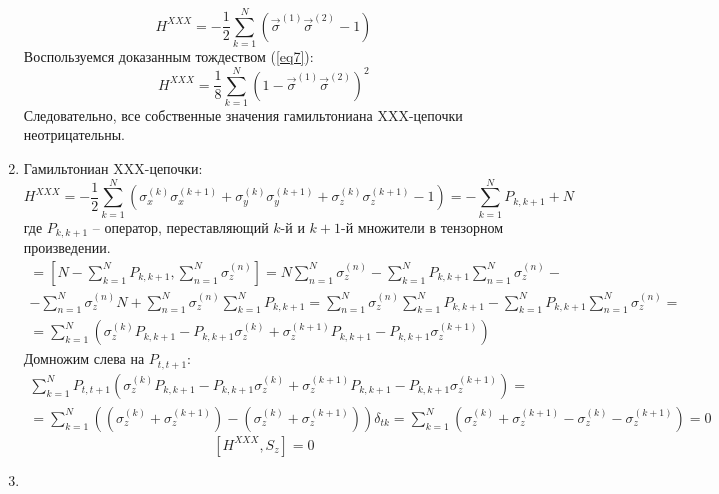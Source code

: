 \documentclass[12pt]{article}
\begin{document}
\begin{enumerate}
\begin{equation}
    \end{equation}
    \begin{equation}
        H^{XXX}=-\frac{1}{2}\sum\limits_{k=1}^N(\vec{\sigma}^{(1)}\vec{\sigma}^{(2)}-1)
    \end{equation}
    Воспользуемся доказанным тождеством (\ref{eq7}):
    \begin{equation}
        H^{XXX}=\frac{1}{8}\sum\limits_{k=1}^N(1-\vec{\sigma}^{(1)}\vec{\sigma}^{(2)})^2
    \end{equation}
    Следовательно, все собственные значения гамильтониана XXX-цепочки неотрицательны.
    \item Гамильтониан XXX-цепочки:
    \begin{equation}
        H^{XXX}=-\frac{1}{2}\sum\limits_{k=1}^N(\sigma_x^{(k)}\sigma_x^{(k+1)}+\sigma_y^{(k)}\sigma_y^{(k+1)}+\sigma_z^{(k)}\sigma_z^{(k+1)}-1)=-\sum\limits_{k=1}^NP_{k,k+1}+N
    \end{equation}
    где $P_{k,k+1}$ -- оператор, переставляющий $k$-й и $k+1$-й множители в тензорном произведении.
    \begin{multline}
        [H^{XXX},S_z]=[N-\sum\limits_{k=1}^NP_{k,k+1},\sum\limits_{n=1}^N\sigma_z^{(n)}]=N\sum\limits_{n=1}^N\sigma_z^{(n)}-\sum\limits_{k=1}^NP_{k,k+1}\sum\limits_{n=1}^N\sigma_z^{(n)}-\\
        -\sum\limits_{n=1}^N\sigma_z^{(n)}N+\sum\limits_{n=1}^N\sigma_z^{(n)}\sum\limits_{k=1}^NP_{k,k+1}=\sum\limits_{n=1}^N\sigma_z^{(n)}\sum\limits_{k=1}^NP_{k,k+1}-\sum\limits_{k=1}^NP_{k,k+1}\sum\limits_{n=1}^N\sigma_z^{(n)}=\\=\sum\limits_{k=1}^N(\sigma_z^{(k)}P_{k,k+1}-P_{k,k+1}\sigma_z^{(k)}+\sigma_z^{(k+1)}P_{k,k+1}-P_{k,k+1}\sigma_z^{(k+1)})
    \end{multline}
    Домножим слева на $P_{t,t+1}$:
    \begin{multline}
        \sum\limits_{k=1}^NP_{t,t+1}(\sigma_z^{(k)}P_{k,k+1}-P_{k,k+1}\sigma_z^{(k)}+\sigma_z^{(k+1)}P_{k,k+1}-P_{k,k+1}\sigma_z^{(k+1)})=\\
        =\sum\limits_{k=1}^N((\sigma_z^{(k)}+\sigma_z^{(k+1)})-(\sigma_z^{(k)}+\sigma_z^{(k+1)}))\delta_{tk}=\sum\limits_{k=1}^N(\sigma_z^{(k)}+\sigma_z^{(k+1)}-\sigma_z^{(k)}-\sigma_z^{(k+1)})=0
    \end{multline}
    \begin{equation}
        \boxed{[H^{XXX},S_z]=0}
    \end{equation}
    \item \begin{itemize}

\end{itemize}
\end{enumerate}
\end{document}
